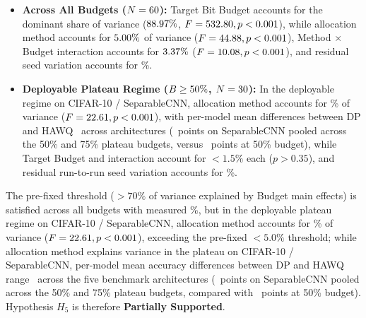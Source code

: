 \documentclass{ieeeaccess}
\begin{document}


\begin{itemize}
    \item \textbf{Across All Budgets ($N = 60$):} Target Bit Budget accounts for the dominant share of variance ($88.97\%$, $F = 532.80, p < 0.001$), while allocation method accounts for $5.00\%$ of variance ($F = 44.88, p < 0.001$), Method $\times$ Budget interaction accounts for $3.37\%$ ($F = 10.08, p < 0.001$), and residual seed variation accounts for \MacroVarResidualPct\%.
    \item \textbf{Deployable Plateau Regime ($B \ge 50\%$, $N = 30$):} In the deployable regime on CIFAR-10 / SeparableCNN, allocation method accounts for \MacroVarPlateauMethodPct\% of variance ($F = 22.61, p < 0.001$), with per-model mean differences between DP and HAWQ \MacroDPHAWQFiftyRange\ across architectures (\MacroMethodPlateauSepEffect\ points on SeparableCNN pooled across the 50\% and 75\% plateau budgets, versus \MacroSepCNNGainFifty\ points at 50\% budget), while Target Budget and interaction account for $<1.5\%$ each ($p > 0.35$), and residual run-to-run seed variation accounts for \MacroVarPlateauResidualPct\%.
\end{itemize}
The pre-fixed threshold ($>70\%$ of variance explained by Budget main effects) is satisfied across all budgets with measured \MacroVarBitsPct\%, but in the deployable plateau regime on CIFAR-10 / SeparableCNN, allocation method accounts for \MacroVarPlateauMethodPct\% of variance ($F = 22.61, p < 0.001$), exceeding the pre-fixed $<5.0\%$ threshold; while allocation method explains variance in the plateau on CIFAR-10 / SeparableCNN, per-model mean accuracy differences between DP and HAWQ range \MacroDPHAWQFiftyRange\ across the five benchmark architectures (\MacroMethodPlateauSepEffect\ points on SeparableCNN pooled across the 50\% and 75\% plateau budgets, compared with \MacroSepCNNGainFifty\ points at 50\% budget). Hypothesis $H_5$ is therefore \textbf{Partially Supported}.
\end{document}

